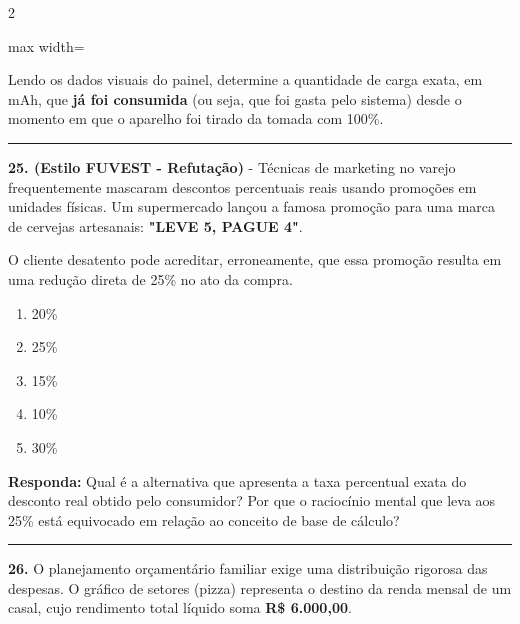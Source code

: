 \documentclass[twoside, 10pt, a4paper]{article}
\newlength{\espacoPreQuestao}
\newlength{\espacoQuestao}
\begin{document}
\begin{multicols*}{2}
\begin{center}
\begin{adjustbox}{max width=\linewidth}
\end{adjustbox}
\end{center}

Lendo os dados visuais do painel, determine a quantidade de carga exata, em mAh, que \textbf{já foi consumida} (ou seja, que foi gasta pelo sistema) desde o momento em que o aparelho foi tirado da tomada com 100\%.
\par\vspace{\espacoQuestao}

\noindent\textcolor{CorLinha}{\rule{\linewidth}{0.5pt}} 
\par\vspace{\espacoPreQuestao}
\textbf{25. (Estilo FUVEST - Refutação)} - Técnicas de marketing no varejo frequentemente mascaram descontos percentuais reais usando promoções em unidades físicas. Um supermercado lançou a famosa promoção para uma marca de cervejas artesanais: \textbf{"LEVE 5, PAGUE 4"}. 

O cliente desatento pode acreditar, erroneamente, que essa promoção resulta em uma redução direta de 25\% no ato da compra.
\begin{enumerate}[label=\alph*)]
    \item 20\%
    \item 25\%
    \item 15\%
    \item 10\%
    \item 30\%
\end{enumerate}
\begin{boxresponda}
\textbf{Responda:} Qual é a alternativa que apresenta a taxa percentual exata do desconto real obtido pelo consumidor? Por que o raciocínio mental que leva aos 25\% está equivocado em relação ao conceito de base de cálculo?
\end{boxresponda}
\par\vspace{\espacoQuestao}
\noindent\textcolor{CorLinha}{\rule{\linewidth}{0.5pt}} 
\par\vspace{\espacoPreQuestao}
\textbf{26.} O planejamento orçamentário familiar exige uma distribuição rigorosa das despesas. O gráfico de setores (pizza) representa o destino da renda mensal de um casal, cujo rendimento total líquido soma \textbf{R\$ 6.000,00}.


\end{multicols*}
\end{document}
